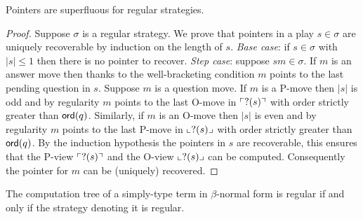 \begin{lem}
\label{lem:regular_pointers_uniqu_recover}
Pointers are superfluous for regular strategies.
\end{lem}
\begin{proof}
Suppose $\sigma$ is a regular strategy. We prove that pointers in a play $s\in \sigma$ are uniquely recoverable by induction on the length of $s$.
\noindent \emph{Base case}: if $s \in \sigma$ with $|s| \leq 1$ then there is no pointer to recover.
\noindent \emph{Step case}: suppose $s m \in \sigma$. If $m$ is an answer move then
thanks to the well-bracketing condition $m$ points to the last pending question in $s$.
Suppose $m$ is a question move.
If $m$ is a P-move then $|s|$ is odd and by regularity
$m$ points to the last O-move in $\ulcorner ?(s) \urcorner$ with order strictly greater than ${\sf ord}(q)$.
Similarly, if $m$ is an O-move then $|s|$ is even and by regularity
$m$ points to the last P-move in $\llcorner ?(s) \lrcorner$ with order strictly greater than ${\sf ord}(q)$.
By the induction hypothesis the pointers in $s$ are recoverable, this ensures that the
P-view $\ulcorner ?(s) \urcorner$ and the O-view $\llcorner ?(s) \lrcorner$ can be computed. Consequently the pointer for $m$ can be (uniquely) recovered.
\end{proof}

\begin{prop}
\label{prop:regular_comp_imp_regular_strat}
The computation tree of a simply-type term in $\beta$-normal form is regular if and only if the strategy denoting it is regular.
\end{prop}

